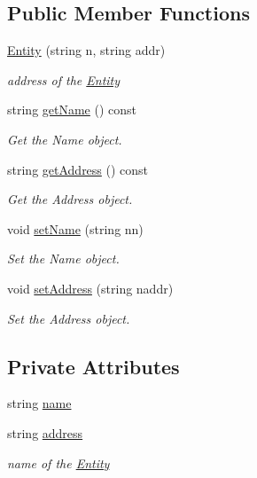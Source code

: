 \subsection*{Public Member Functions}
\begin{DoxyCompactItemize}
\item 
\hyperlink{classEntity_ae540a46bdc1983a49127e0ac31884eee}{Entity} (string n, string addr)
\begin{DoxyCompactList}\small\item\em address of the \hyperlink{classEntity}{Entity} \end{DoxyCompactList}\item 
string \hyperlink{classEntity_a438837d2be5b221fd9aafc323c46f08a}{get\+Name} () const
\begin{DoxyCompactList}\small\item\em Get the Name object. \end{DoxyCompactList}\item 
string \hyperlink{classEntity_a8acaa5f9e84722ea668a0e33789c347e}{get\+Address} () const
\begin{DoxyCompactList}\small\item\em Get the Address object. \end{DoxyCompactList}\item 
void \hyperlink{classEntity_a6b6078942e4000e136e13aeccefba0eb}{set\+Name} (string nn)
\begin{DoxyCompactList}\small\item\em Set the Name object. \end{DoxyCompactList}\item 
void \hyperlink{classEntity_ae362658ba037f024aa5edc2cdce2d833}{set\+Address} (string naddr)
\begin{DoxyCompactList}\small\item\em Set the Address object. \end{DoxyCompactList}\end{DoxyCompactItemize}
\subsection*{Private Attributes}
\begin{DoxyCompactItemize}
\item 
string \hyperlink{classEntity_afb45718695f537c330a463168616c262}{name}
\item 
string \hyperlink{classEntity_a3db10b65d221e6066fbdeebe17d5af42}{address}
\begin{DoxyCompactList}\small\item\em name of the \hyperlink{classEntity}{Entity} \end{DoxyCompactList}\end{DoxyCompactItemize}
